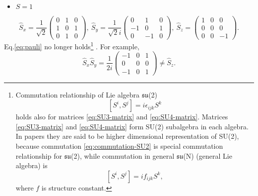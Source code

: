 \documentclass[11pt, aps, longbibliography]{article}
\begin{document}
        \begin{itemize}
            \item $S=1$
        \end{itemize}
        \begin{equation}\label{eq:SU3-matrix}
            \hat{S}_x = \frac{1}{\sqrt{2}}\begin{pmatrix} 0 & 1 & 0 \\ 1 & 0 & 1 \\ 0 & 1 & 0 \end{pmatrix}, \ 
            \hat{S}_y = \frac{1}{\sqrt{2}i}\begin{pmatrix} 0 & 1 & 0 \\ -1 & 0 & 1 \\ 0 & -1 & 0 \end{pmatrix}, \ 
            \hat{S}_z = \begin{pmatrix} 1 & 0 & 0 \\ 0 & 0 & 0 \\ 0 & 0 & -1 \end{pmatrix}.
        \end{equation}
        Eq.\eqref{eq:pauli} no longer holds\footnote{Commutation relationship of Lie algebra $\mathfrak{su}$(2) \begin{equation}\label{eq:commutation-SU2}
            \left[S^i, S^j\right] = i\epsilon_{ijk}S^k
        \end{equation}
        holds also for matrices \eqref{eq:SU3-matrix} and \eqref{eq:SU4-matrix}. Matrices \eqref{eq:SU3-matrix} and \eqref{eq:SU4-matrix} form SU(2) subalgebra in each algebra. In papers they are said to be higher dimensional representation of SU(2),
        because commutation \eqref{eq:commutation-SU2} is special commutation relationship for $\mathfrak{su}$(2), while commutation in general $\mathfrak{su}$(N) (general Lie algebra) is \begin{equation}
            \left[S^i, S^j\right] = if_{ijk}S^k,
        \end{equation}
        where $f$ is structure constant.
        }
        . For example,
        \begin{equation}
            \hat{S}_x\hat{S}_y = \frac{1}{2i} \begin{pmatrix}-1 & 0 & 1 \\ 0 & 0 & 0 \\ -1 & 0 & 1\end{pmatrix} \neq \hat{S}_z.
        \end{equation}
\end{document}
